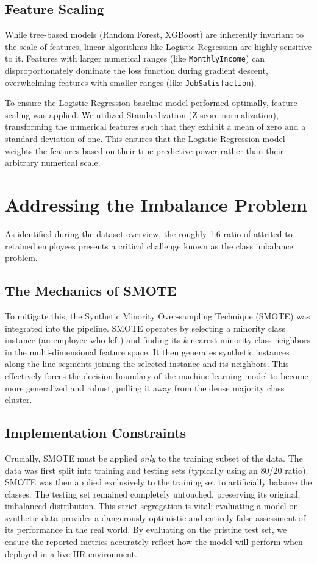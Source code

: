 \subsection{Feature Scaling}
While tree-based models (Random Forest, XGBoost) are inherently invariant to the scale of features, linear algorithms like Logistic Regression are highly sensitive to it. Features with larger numerical ranges (like \texttt{MonthlyIncome}) can disproportionately dominate the loss function during gradient descent, overwhelming features with smaller ranges (like \texttt{JobSatisfaction}). 

To ensure the Logistic Regression baseline model performed optimally, feature scaling was applied. We utilized Standardization (Z-score normalization), transforming the numerical features such that they exhibit a mean of zero and a standard deviation of one. This ensures that the Logistic Regression model weights the features based on their true predictive power rather than their arbitrary numerical scale.

\section{Addressing the Imbalance Problem}
As identified during the dataset overview, the roughly 1:6 ratio of attrited to retained employees presents a critical challenge known as the class imbalance problem.

\subsection{The Mechanics of SMOTE}
To mitigate this, the Synthetic Minority Over-sampling Technique (SMOTE) was integrated into the pipeline. SMOTE operates by selecting a minority class instance (an employee who left) and finding its $k$ nearest minority class neighbors in the multi-dimensional feature space. It then generates synthetic instances along the line segments joining the selected instance and its neighbors. This effectively forces the decision boundary of the machine learning model to become more generalized and robust, pulling it away from the dense majority class cluster.

\subsection{Implementation Constraints}
Crucially, SMOTE must be applied \textit{only} to the training subset of the data. The data was first split into training and testing sets (typically using an 80/20 ratio). SMOTE was then applied exclusively to the training set to artificially balance the classes. The testing set remained completely untouched, preserving its original, imbalanced distribution. This strict segregation is vital; evaluating a model on synthetic data provides a dangerously optimistic and entirely false assessment of its performance in the real world. By evaluating on the pristine test set, we ensure the reported metrics accurately reflect how the model will perform when deployed in a live HR environment.
